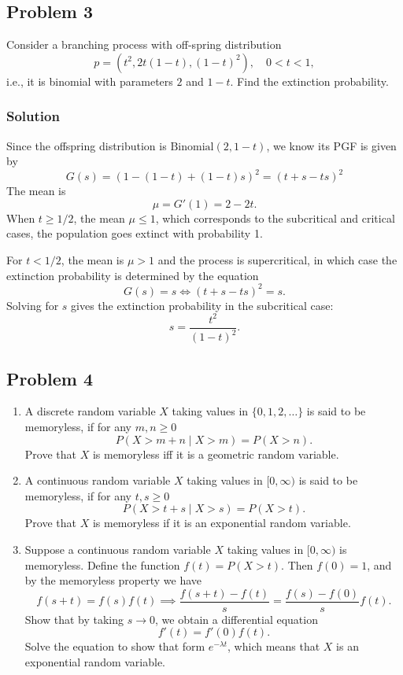 \documentclass[oneside, a4paper]{amsart}
\newcommand{\Bin}{\mathrm{Binomial}}
\begin{document}
\subsection*{Problem 3}

Consider a branching process with off-spring distribution 
\[
	p = \left(t^2, 2t(1-t), (1-t)^2\right), \quad 0 < t < 1,
\]	
i.e., it is binomial with parameters $2$ and $1-t$. Find the extinction probability. 
\subsubsection*{Solution}

Since the offspring distribution is $\Bin(2,1-t)$, we know its PGF is given by
\[
	G(s)  = (1 - (1-t) + (1-t)s)^2 = (t+s - ts)^2
\]
The mean is 
\[
	\mu = G'(1) = 2- 2t.
\]
When $t  \geq 1/2$, the mean $\mu \leq 1$, which corresponds to the subcritical and critical cases, the population goes extinct with probability 1.
\par
For $t < 1/2$, the mean is $\mu > 1$ and the process is supercritical, in which case the extinction probability is determined by the equation
\[
	G(s)=s \iff (t+s - ts)^2 =s.
\] 
Solving for $s$ gives the extinction probability in the subcritical case: 
\[
	s = \frac{t^2}{(1-t)^2}.
\]


\subsection*{Problem 4}

\begin{enumerate}
\item
A discrete random variable $X$ taking values in $\{0, 1, 2, \dotsc \}$ is said to be memoryless, if for any $m, n \geq 0$
\[	
	P(X > m + n \mid X > m) = P(X > n).
\]
Prove that $X$ is memoryless iff it is a geometric random variable.
\item
A continuous random variable $X$ taking values in $[0, \infty)$ is said to be memoryless, if for any $t,s\geq 0$ 
\[
	P(X > t + s \mid X > s) = P(X > t).
\]
Prove that $X$ is memoryless if it is an exponential random variable. 
\item
Suppose a continuous random variable $X$ taking values in $[0, \infty)$ is memoryless. Define the function $f(t) = P(X > t)$. Then $f(0)=1$, and by the memoryless property we have 
\[
	f(s+t) = f(s)f(t) \implies \frac{f(s+t) - f(t)}{s} = \frac{f(s) - f(0)}{s} f(t).
\] 
Show that by taking $s \to 0$, we obtain a differential equation 
\[
	f'(t) = f'(0)f(t).
\]
Solve the equation to show that form $e^{-\lambda t}$, which means that $X$ is an exponential random variable. 
\end{enumerate}
\end{document}
